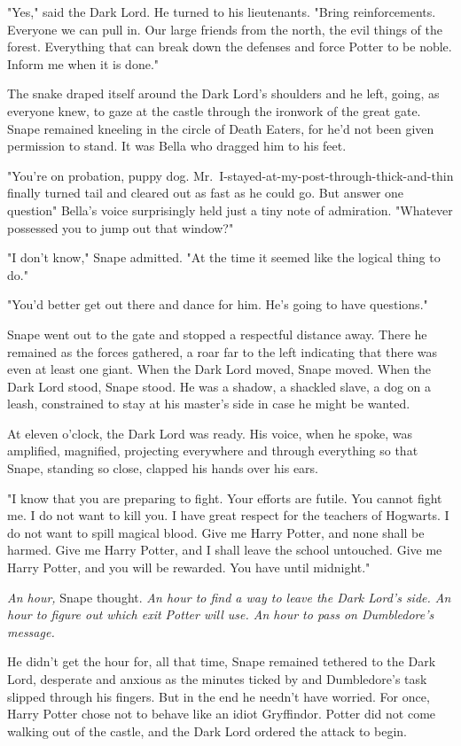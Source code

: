 "Yes," said the Dark Lord. He turned to his lieutenants. "Bring reinforcements. Everyone we can pull in. Our large friends from the north, the evil things of the forest. Everything that can break down the defenses and force Potter to be noble. Inform me when it is done."

The snake draped itself around the Dark Lord's shoulders and he left, going, as everyone knew, to gaze at the castle through the ironwork of the great gate. Snape remained kneeling in the circle of Death Eaters, for he'd not been given permission to stand. It was Bella who dragged him to his feet.

"You're on probation, puppy dog. Mr.~I-stayed-at-my-post-through-thick-and-thin finally turned tail and cleared out as fast as he could go. But answer one question{\el}" Bella's voice surprisingly held just a tiny note of admiration. "Whatever possessed you to jump out that window?"

"I don't know," Snape admitted. "At the time it seemed like the logical thing to do."

"You'd better get out there and dance for him. He's going to have questions."

Snape went out to the gate and stopped a respectful distance away. There he remained as the forces gathered, a roar far to the left indicating that there was even at least one giant. When the Dark Lord moved, Snape moved. When the Dark Lord stood, Snape stood. He was a shadow, a shackled slave, a dog on a leash, constrained to stay at his master's side in case he might be wanted.

At eleven o'clock, the Dark Lord was ready. His voice, when he spoke, was amplified, magnified, projecting everywhere and through everything so that Snape, standing so close, clapped his hands over his ears.

"I know that you are preparing to fight. Your efforts are futile. You cannot fight me. I do not want to kill you. I have great respect for the teachers of Hogwarts. I do not want to spill magical blood. Give me Harry Potter, and none shall be harmed. Give me Harry Potter, and I shall leave the school untouched. Give me Harry Potter, and you will be rewarded. You have until midnight."

\emph{An hour,} Snape thought. \emph{An hour to find a way to leave the Dark Lord's side. An hour to figure out which exit Potter will use. An hour to pass on Dumbledore's message.}

He didn't get the hour for, all that time, Snape remained tethered to the Dark Lord, desperate and anxious as the minutes ticked by and Dumbledore's task slipped through his fingers. But in the end he needn't have worried. For once, Harry Potter chose not to behave like an idiot Gryffindor. Potter did not come walking out of the castle, and the Dark Lord ordered the attack to begin.

